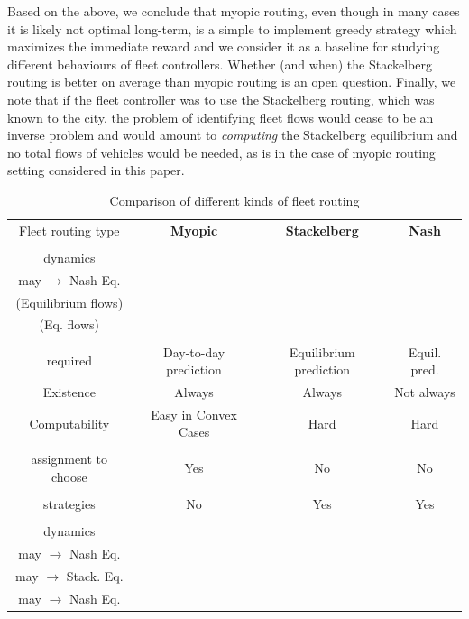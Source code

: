\documentclass[a4paper,11pt]{article}
\begin{document}
Based on the above, we conclude that myopic routing, even though in many cases it is likely not optimal long-term,  is a simple to implement greedy strategy which maximizes the immediate reward and we consider it as a baseline for studying different behaviours of fleet controllers. Whether (and when) the Stackelberg routing is better on average than myopic routing is an open question. Finally, we note that if the fleet controller was to use the Stackelberg routing, which was known to the city, the problem of identifying fleet flows would cease to be an inverse problem and would amount to \emph{computing} the Stackelberg equilibrium and no total flows of vehicles would be needed, as is in the case of myopic routing setting considered in this paper. 

\begin{table}[h!]
\label{Tab_routings}
\caption{Comparison of different kinds of fleet routing}
\centering
\begin{tabular}{|c||c|c|c|}
\hline
Fleet routing type & {\bf Myopic} & {\bf Stackelberg} & {\bf Nash} \\ 
\Xhline{3\arrayrulewidth}
\makecell{Fleet assignment \\dynamics} & \makecell{Dynamic, \\ may $\rightarrow$ Nash Eq. }& \makecell{Static \\ (Equilibrium flows)} & \makecell{Static \\ (Eq. flows)}
\\
\hline
\makecell{Human model \\ required} & Day-to-day prediction & Equilibrium prediction & Equil. pred.
\\
\hline
Existence & Always& Always& Not always 
\\
\hline
Computability & Easy in Convex Cases& Hard& Hard 
\\
\hline
\makecell{Clarity which\\assignment to choose} & Yes & No & No 
\\
\hline
\makecell{Requires mixed\\strategies} & No & Yes & Yes 
\\
\Xhline{3\arrayrulewidth}
\makecell{HDV assignment\\dynamics}& \makecell{Dynamic, \\ may $\rightarrow$ Nash Eq.}& \makecell{Dynamic, \\ may $\rightarrow$ Stack. Eq.} & \makecell{Dynamic \\may $\rightarrow$ Nash Eq.}
\\

\end{tabular}
\end{table}
\end{document}

